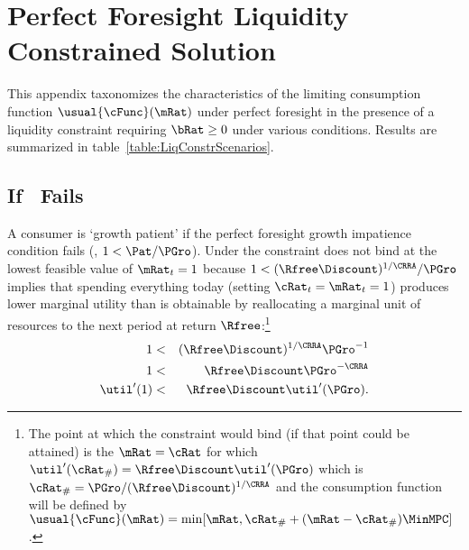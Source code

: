 \documentclass[./BufferStockTheory.tex]{subfiles}
\begin{document}
\section{Perfect Foresight Liquidity Constrained Solution}\label{sec:ApndxLiqConstr}

  This appendix taxonomizes the characteristics of the limiting
  consumption function $\usual{\cFunc}(\mRat)$ under perfect
  foresight in the presence of a liquidity constraint requiring $\bRat
  \geq 0$ under various conditions.  Results are summarized in
  table~\ref{table:LiqConstrScenarios}.


\subsection{If \GICRaw~Fails}

A consumer is `growth patient' if the perfect foresight growth
impatience condition fails (\cncl{\GICRaw}, $1 < \Pat/\PGro$).  Under
\cncl{\GICRaw} the constraint does not bind at the lowest feasible value of $\mRat_{t}=1$ because
$1 < (\Rfree\Discount)^{1/\CRRA}/\PGro$ implies that spending
everything today (setting $\cRat_{t}=\mRat_{t}=1$) produces lower
marginal utility than is obtainable by reallocating a marginal unit of
resources to the next period at return $\Rfree$:\footnote{The point at
  which the constraint would bind (if that point could be attained) is
  the $\mRat=\cRat$ for which $\util^{\prime}(\cRat_{\#}) = \Rfree
  \Discount \util^{\prime}(\PGro)$ which is $\cRat_{\#} =
  \PGro/(\Rfree \Discount)^{1/\CRRA}$ and the consumption function
  will be defined by
  $\usual{\cFunc}(\mRat)=\min[\mRat,\cRat_{\#}+(\mRat-\cRat_{\#})\MinMPC
  ]$.}
\begin{eqnarray}
1 & < & (\Rfree \Discount)^{1/\CRRA}\PGro^{-1}   \label{eq:EulerGICRawFails}
\\ 1 & < & \Rfree \Discount \PGro^{-\CRRA}
\\  \util^{\prime}(1) & < & \Rfree \Discount \util^{\prime}(\PGro)   \label{eq:EulerGICRawFailsEnd}.
\end{eqnarray}
\end{document}
